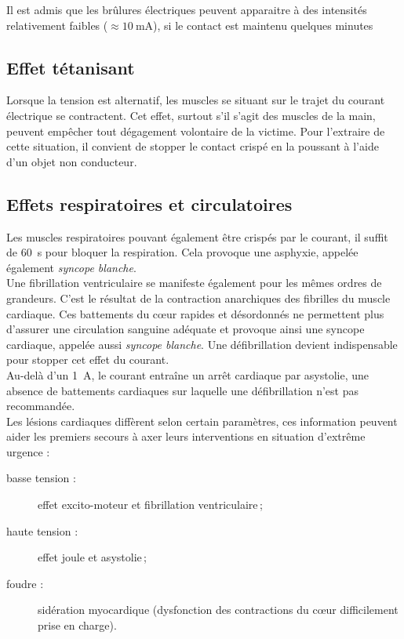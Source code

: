 Il est admis que les brûlures électriques peuvent apparaitre à des intensités relativement faibles ($\approx \SI{10}{\milli\ampere}$), si le contact est maintenu quelques minutes

\subsection{Effet tétanisant}

Lorsque la tension est alternatif, les muscles se situant sur le trajet du courant électrique se contractent. Cet effet, surtout s'il s'agit des muscles de la main, peuvent empêcher tout dégagement volontaire de la victime. Pour l'extraire de cette situation, il convient de stopper le contact crispé en la poussant à l'aide d'un objet non conducteur.

\subsection{Effets respiratoires et circulatoires}

Les muscles respiratoires pouvant également être crispés par le courant, il suffit de \SI{60}{\second} pour bloquer la respiration. Cela provoque une asphyxie, appelée également \emph{syncope blanche}.\\
Une fibrillation ventriculaire se manifeste également pour les mêmes ordres de grandeurs. C'est le résultat de la contraction anarchiques des fibrilles du muscle cardiaque. Ces battements du c\oe{}ur rapides et désordonnés ne permettent plus d'assurer une circulation sanguine adéquate et provoque ainsi une syncope cardiaque, appelée aussi \emph{syncope blanche}. Une défibrillation devient indispensable pour stopper cet effet du courant.\\
Au-delà d'un \SI{1}{\ampere}, le courant entraîne un arrêt cardiaque par asystolie, une absence de battements cardiaques sur laquelle une défibrillation n'est pas recommandée.\\
Les lésions cardiaques diffèrent selon certain paramètres, ces information peuvent aider les premiers secours à axer leurs interventions en situation d'extrême urgence : 
\begin{description}
\item[basse tension :] effet excito-moteur et fibrillation ventriculaire\,;
\item[haute tension :] effet joule et asystolie\,;
\item[foudre :] sidération myocardique (dysfonction des contractions du c\oe{}ur difficilement prise en charge).
\end{description}

